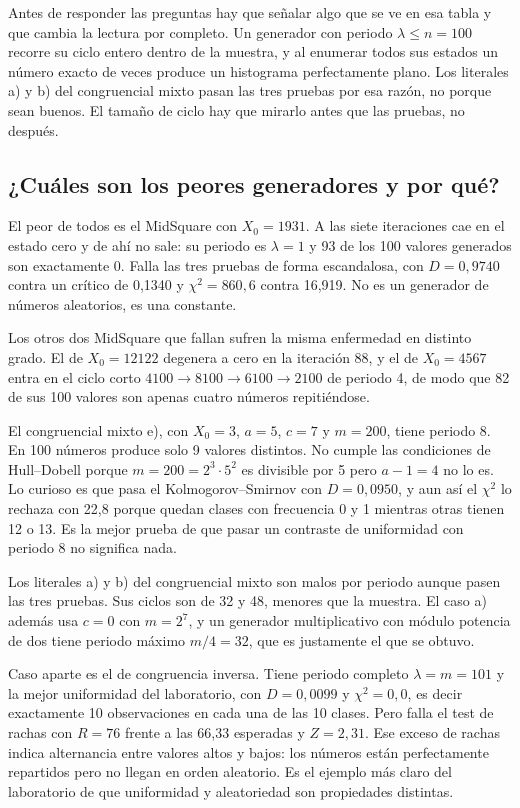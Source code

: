 \documentclass[11pt,letterpaper]{article}
\begin{document}
Antes de responder las preguntas hay que señalar algo que se ve en esa tabla y que cambia la lectura
por completo. Un generador con periodo $\lambda \le n = 100$ recorre su ciclo entero dentro de la
muestra, y al enumerar todos sus estados un número exacto de veces produce un histograma
perfectamente plano. Los literales a) y b) del congruencial mixto pasan las tres pruebas por esa
razón, no porque sean buenos. El tamaño de ciclo hay que mirarlo antes que las pruebas, no después.

\subsection{¿Cuáles son los peores generadores y por qué?}

El peor de todos es el MidSquare con $X_0 = 1931$. A las siete iteraciones cae en el estado cero y de
ahí no sale: su periodo es $\lambda = 1$ y 93 de los 100 valores generados son exactamente 0. Falla
las tres pruebas de forma escandalosa, con $D = 0{,}9740$ contra un crítico de 0,1340 y
$\chi^2 = 860{,}6$ contra 16,919. No es un generador de números aleatorios, es una constante.

Los otros dos MidSquare que fallan sufren la misma enfermedad en distinto grado. El de
$X_0 = 12122$ degenera a cero en la iteración 88, y el de $X_0 = 4567$ entra en el ciclo corto
$4100 \to 8100 \to 6100 \to 2100$ de periodo 4, de modo que 82 de sus 100 valores son apenas cuatro
números repitiéndose.

El congruencial mixto e), con $X_0 = 3$, $a = 5$, $c = 7$ y $m = 200$, tiene periodo 8. En 100
números produce solo 9 valores distintos. No cumple las condiciones de Hull--Dobell porque
$m = 200 = 2^3 \cdot 5^2$ es divisible por 5 pero $a - 1 = 4$ no lo es. Lo curioso es que pasa el
Kolmogorov--Smirnov con $D = 0{,}0950$, y aun así el $\chi^2$ lo rechaza con 22,8 porque quedan
clases con frecuencia 0 y 1 mientras otras tienen 12 o 13. Es la mejor prueba de que pasar un
contraste de uniformidad con periodo 8 no significa nada.

Los literales a) y b) del congruencial mixto son malos por periodo aunque pasen las tres pruebas. Sus
ciclos son de 32 y 48, menores que la muestra. El caso a) además usa $c = 0$ con $m = 2^7$, y un
generador multiplicativo con módulo potencia de dos tiene periodo máximo $m/4 = 32$, que es
justamente el que se obtuvo.

Caso aparte es el de congruencia inversa. Tiene periodo completo $\lambda = m = 101$ y la mejor
uniformidad del laboratorio, con $D = 0{,}0099$ y $\chi^2 = 0{,}0$, es decir exactamente 10
observaciones en cada una de las 10 clases. Pero falla el test de rachas con $R = 76$ frente a las
66,33 esperadas y $Z = 2{,}31$. Ese exceso de rachas indica alternancia entre valores altos y bajos:
los números están perfectamente repartidos pero no llegan en orden aleatorio. Es el ejemplo más claro
del laboratorio de que uniformidad y aleatoriedad son propiedades distintas.
\end{document}
